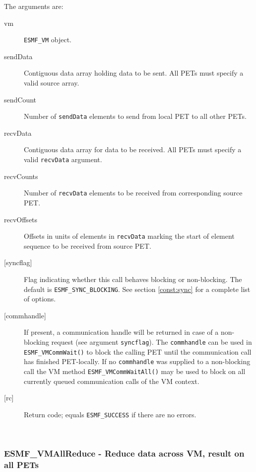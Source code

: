      The arguments are:
     \begin{description}
     \item[vm] 
          {\tt ESMF\_VM} object.
     \item[sendData]
          Contiguous data array holding data to be sent. All PETs must specify a
          valid source array.
     \item[sendCount] 
          Number of {\tt sendData} elements to send from local PET to all other
          PETs.
     \item[recvData] 
          Contiguous data array for data to be received. All PETs must specify a
          valid {\tt recvData} argument.
     \item[recvCounts] 
          Number of {\tt recvData} elements to be received from corresponding
          source PET.
     \item[recvOffsets] 
          Offsets in units of elements in {\tt recvData} marking the start of
          element sequence to be received from source PET.
     \item[{[syncflag]}]
          Flag indicating whether this call behaves blocking or non-blocking.
          The default is {\tt ESMF\_SYNC\_BLOCKING}. See section
          \ref{const:sync} for a complete list of options.
     \item[{[commhandle]}]
          If present, a communication handle will be returned in case of a 
          non-blocking request (see argument {\tt syncflag}). The
          {\tt commhandle} can be used in {\tt ESMF\_VMCommWait()} to block the
          calling PET until the communication call has finished PET-locally. If
          no {\tt commhandle} was supplied to a non-blocking call the VM method
          {\tt ESMF\_VMCommWaitAll()} may be used to block on all currently queued
          communication calls of the VM context.
     \item[{[rc]}] 
          Return code; equals {\tt ESMF\_SUCCESS} if there are no errors.
     \end{description}
   
 
\mbox{}\hrulefill\ 
 
\subsubsection [ESMF\_VMAllReduce] {ESMF\_VMAllReduce - Reduce data across VM, result on all PETs}


